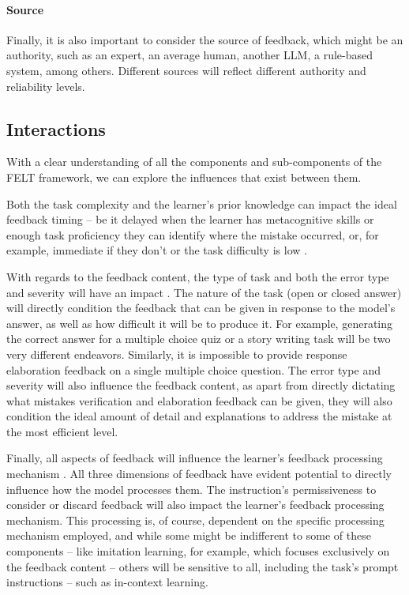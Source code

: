 \paragraph{Source} Finally, it is also important to consider the source of feedback, which might be an authority, such as an expert, an average human, another LLM, a rule-based system, among others. Different sources will reflect different authority and reliability levels.

\subsection{Interactions}
With a clear understanding of all the components and sub-components of the FELT framework, we can explore the influences that exist between them.

Both the task complexity and the learner's prior knowledge can impact the ideal feedback timing -- be it delayed when the learner has metacognitive skills \citep{narciss_feedback_2008} or enough task proficiency \citep{mason_providing_2001} they can identify where the mistake occurred, or, for example, immediate if they don't \citep{narciss_feedback_2008} or the task difficulty is low \citep{mason_providing_2001}.

With regards to the feedback content, the type of task \citep{butler_feedback_1995, kluger_effects_1996, mason_providing_2001, anastasiya_a_lipnevich_david_a_g_berg_jeffrey_k_smith_toward_2016} and both the error type and severity will have an impact \citep{narciss_how_2004, narciss_feedback_2008}. The nature of the task (open or closed answer) will directly condition the feedback that can be given in response to the model's answer, as well as how difficult it will be to produce it. For example, generating the correct answer for a multiple choice quiz or a story writing task will be two very different endeavors. Similarly, it is impossible to provide response elaboration feedback on a single multiple choice question.
The error type and severity will also influence the feedback content, as apart from directly dictating what mistakes verification and elaboration feedback can be given, they will also condition the ideal amount of detail and explanations to address the mistake at the most efficient level.

Finally, all aspects of feedback will influence the learner's feedback processing mechanism \citep{kulhavy_feedback_1989, sadler_formative_1989, bangert-drowns_instructional_1991, butler_feedback_1995, kluger_effects_1996, narciss_how_2004, nicol_formative_2006, narciss_feedback_2008, anastasiya_a_lipnevich_david_a_g_berg_jeffrey_k_smith_toward_2016, carless_development_2018}. All three dimensions of feedback have evident potential to directly influence how the model processes them. The instruction's permissiveness to consider or discard feedback will also impact the learner's feedback processing mechanism. This processing is, of course, dependent on the specific processing mechanism employed, and while some might be indifferent to some of these components -- like imitation learning, for example, which focuses exclusively on the feedback content -- others will be sensitive to all, including the task's prompt instructions -- such as in-context learning.
